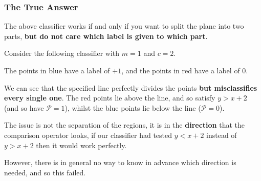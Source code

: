 \documentclass[a4paper,openany,11pt]{book}
\begin{document}
					\subsubsection{The True Answer}

						The above classifier works if and only if you want to split the plane into two parts, \textbf{but do not care which label is given to which part}. 

						Consider the following classifier with $m = 1$ and $c = 2$.

						\begin{center}
							\end{center}
							The points in blue have a label of $+1$, and the points in red have a label of 0.

							We can see that the specified line perfectly divides the points \textbf{but misclassifies every single one}. The red points lie above the line, and so satisfy $y > x + 2$ (and so have $\mathcal{P} = 1$), whilst the blue points lie below the line ($\mathcal{P} = 0$).

							The issue is not the separation of the regions, it is in the \textbf{direction} that the comparison operator looks, if our classifier had tested $y < x + 2$ instead of $y > x+2$ then it would work perfectly. 

							However, there is in general no way to know in advance which direction is needed, and so this failed. 
\end{document}

